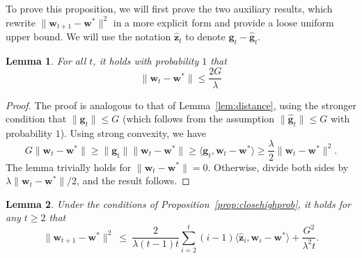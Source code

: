 \documentclass{article}
\newtheorem{lemma}{Lemma}
\newcommand{\bw}{\mathbf{w}}
\newcommand{\bz}{\mathbf{z}}
\newcommand{\bg}{\mathbf{g}}
\newcommand{\norm}[1]{\|#1\|}
\newcommand{\inner}[1]{\langle#1\rangle}
\newcommand{\lemref}[1]{Lemma~\ref{#1}}
\newcommand{\propref}[1]{Proposition~\ref{#1}}
\begin{document}
To prove this proposition, we will first prove the two auxiliary results, which rewrite $\norm{\bw_{t+1}-\bw^{*}}^2$ in a more explicit form and provide a loose uniform upper bound. We will use the notation $\hat{\bz}_t$ to denote $\bg_t-\hat{\bg}_t$.

\begin{lemma}\label{lem:uniformupperbound}
For all $t$, it holds with probability $1$ that
\[
\norm{\bw_t-\bw^*}\leq \frac{2G}{\lambda}
\]
\end{lemma}
\begin{proof}
The proof is analogous to that of \lemref{lem:distance}, using the stronger condition that $\norm{\bg_t}\leq G$ (which follows from the assumption $\norm{\hat{\bg}_t}\leq G$ with probability $1$). Using strong convexity, we have
\[
G\norm{\bw_t-\bw^*}\geq \norm{\bg_t}\norm{\bw_t-\bw^*}\geq \inner{\bg_t,\bw_t-\bw^*} \geq \frac{\lambda}{2}\norm{\bw_t-\bw^*}^2.
\]
The lemma trivially holds for $\norm{\bw_t-\bw^*}=0$. Otherwise, divide both sides by $\lambda\norm{\bw_t-\bw^*}/2$, and the result follows.
\end{proof}

\begin{lemma} \label{lem:recursive-def}
Under the conditions of \propref{prop:closehighprob}, it holds for any $t\geq 2$ that
\[
\norm{\bw_{t+1}-\bw^{*}}^2 ~\leq~
\frac{2}{\lambda(t-1)t}\sum_{i= 2 }^{t}(i-1)\inner{\hat{\bz}_i,\bw_i-\bw^*}
+\frac{G^2}{\lambda^2 t}.
\]
\end{lemma}
\end{document}
